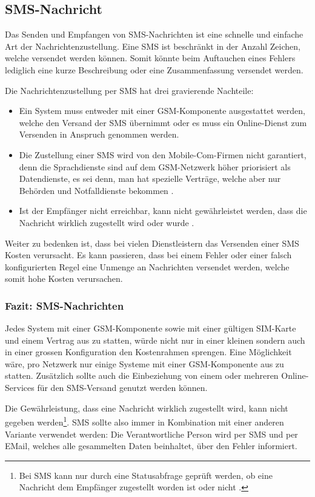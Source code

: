 \subsection{SMS-Nachricht} \label{sec:theorie-alert-sms}
Das Senden und Empfangen von SMS-Nachrichten ist eine schnelle und einfache Art der Nachrichtenzustellung. Eine SMS ist beschr\"ankt in der Anzahl Zeichen, welche versendet werden k\"onnen. Somit k\"onnte beim Auftauchen eines Fehlers lediglich eine kurze Beschreibung oder eine Zusammenfassung versendet werden.

Die Nachrichtenzustellung per SMS hat drei gravierende Nachteile:
\begin{itemize}
 \item Ein System muss entweder mit einer GSM-Komponente ausgestattet werden, welche den Versand der SMS \"ubernimmt oder es muss ein Online-Dienst zum Versenden in Anspruch genommen werden.
 \item Die Zustellung einer SMS wird von den Mobile-Com-Firmen nicht garantiert, denn die Sprachdienste sind auf dem GSM-Netzwerk h\"oher priorisiert als Datendienste, es sei denn, man hat spezielle Vertr\"age, welche aber nur Beh\"orden und Notfalldienste bekommen \cite{tannenbaum}.
 \item Ist der Empf\"anger nicht erreichbar, kann nicht gew\"ahrleistet werden, dass die Nachricht wirklich zugestellt wird oder wurde \cite{tannenbaum}.
\end{itemize}

Weiter zu bedenken ist, dass bei vielen Dienstleistern das Versenden einer SMS Kosten verursacht. Es kann passieren, dass bei einem Fehler oder einer falsch konfigurierten Regel eine Unmenge an Nachrichten versendet werden, welche somit hohe Kosten verursachen.

\subsubsection{Fazit: SMS-Nachrichten} \label{sec:theorie-alert-sms-fazit}
Jedes System mit einer GSM-Komponente sowie mit einer g\"ultigen SIM-Karte und einem Vertrag aus zu statten, w\"urde nicht nur in einer kleinen sondern auch in einer grossen Konfiguration den Kostenrahmen sprengen. Eine M\"oglichkeit w\"are, pro Netzwerk nur einige Systeme mit einer GSM-Komponente aus zu statten. Zus\"atzlich sollte auch die Einbeziehung von einem oder mehreren Online-Services f\"ur den SMS-Versand genutzt werden k\"onnen.

Die Gew\"ahrleistung, dass eine Nachricht wirklich zugestellt wird, kann nicht gegeben werden\footnote{Bei SMS kann nur durch eine Statusabfrage gepr\"uft werden, ob eine Nachricht dem Empf\"anger zugestellt worden ist oder nicht \cite{tannenbaum}.}. SMS sollte also immer in Kombination mit einer anderen Variante verwendet werden: Die Verantwortliche Person wird per SMS und per EMail, welches alle gesammelten Daten beinhaltet, \"uber den Fehler informiert.

